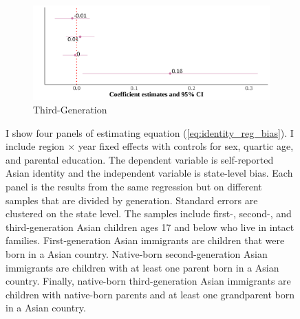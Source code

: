 \documentclass[12pt,english]{article}
\begin{document}
\begin{center}
\begin{figure}[!htb]
\begin{subfigure}{.48\textwidth}
\caption{Third-Generation}
\centering
\includegraphics[width=.9\linewidth]{figure/msa-skin-iat-regression-third-gen.png}
\end{subfigure}
\caption*{\footnotesize{I show four panels of estimating equation (\ref{eq:identity_reg_bias}). I include region $\times$ year fixed effects with controls for sex, quartic age, and parental education. The dependent variable is self-reported Asian identity and the independent variable is state-level bias. Each panel is the results from the same regression but on different samples that are divided by generation. Standard errors are clustered on the state level. The samples include first-, second-, and third-generation Asian children ages 17 and below who live in intact families. First-generation Asian immigrants are children that were born in a Asian country. Native-born second-generation Asian immigrants are children with at least one parent born in a Asian country. Finally, native-born third-generation Asian immigrants are children with native-born parents and at least one grandparent born in a Asian country.}}
\end{figure}
\end{center}

\pagebreak
\newpage
\end{document}
